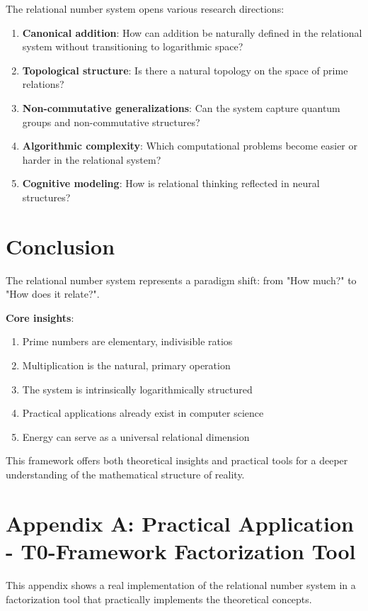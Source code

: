 \documentclass[11pt,a4paper]{article}
\begin{document}
	The relational number system opens various research directions:
	
	\begin{enumerate}
		\item \textbf{Canonical addition}: How can addition be naturally defined in the relational system without transitioning to logarithmic space?
		\item \textbf{Topological structure}: Is there a natural topology on the space of prime relations?
		\item \textbf{Non-commutative generalizations}: Can the system capture quantum groups and non-commutative structures?
		\item \textbf{Algorithmic complexity}: Which computational problems become easier or harder in the relational system?
		\item \textbf{Cognitive modeling}: How is relational thinking reflected in neural structures?
	\end{enumerate}
	
	\section{Conclusion}
	
	The relational number system represents a paradigm shift: from "How much?" to "How does it relate?". 
	
	\textbf{Core insights}:
	\begin{enumerate}
		\item Prime numbers are elementary, indivisible ratios
		\item Multiplication is the natural, primary operation
		\item The system is intrinsically logarithmically structured
		\item Practical applications already exist in computer science
		\item Energy can serve as a universal relational dimension
	\end{enumerate}
	
	This framework offers both theoretical insights and practical tools for a deeper understanding of the mathematical structure of reality.
	
	\section{Appendix A: Practical Application - T0-Framework Factorization Tool}
	
	This appendix shows a real implementation of the relational number system in a factorization tool that practically implements the theoretical concepts.
	
\end{document}
